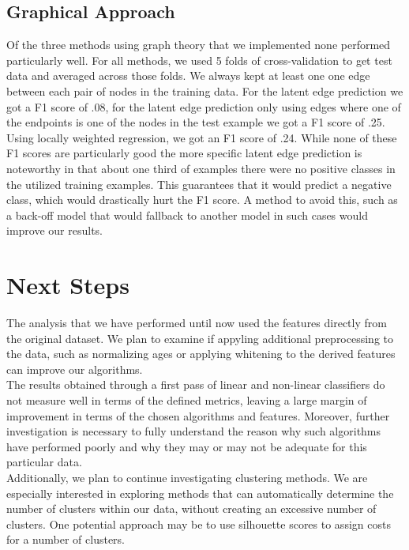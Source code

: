 \documentclass[twoside,twocolumn,paper=letter,fontsize=11pt]{article}
\begin{document}
\subsection{Graphical Approach}

Of the three methods using graph theory that we implemented none performed
particularly well. For all methods, we used 5 folds of cross-validation
to get test data and averaged across those folds. We always kept at least one
one edge between each pair of nodes in the training data. For the latent edge
prediction we got a F1 score of .08, for the latent edge prediction only using
edges where one of the endpoints is one of the nodes in the test example we got
a F1 score of .25. Using locally weighted regression, we got an F1 score of
.24. While none of these F1 scores are particularly good the more specific
latent edge prediction is noteworthy in that about one third of examples there
were no positive classes in the utilized training examples. This guarantees
that it would predict a negative class, which would drastically hurt the F1
score. A method to avoid this, such as a back-off model that would
fallback to another model in such cases would improve our results.
\section{Next Steps}

The analysis that we have performed until now used the features directly from
the original dataset. We plan to examine if appyling additional preprocessing to
the data, such as normalizing ages or applying whitening to the derived features
can improve our algorithms.\\

The results obtained through a first pass of linear and non-linear classifiers
do not measure well in terms of the defined metrics, leaving a large margin of
improvement in terms of the chosen algorithms and features. Moreover, further
investigation is necessary to fully understand  the reason why such algorithms
have performed poorly and why they may or may not be adequate for this
particular data. \\

Additionally, we plan to continue investigating clustering methods. We are
especially interested in exploring methods that can automatically determine the
number of clusters within our data, without creating an excessive number of
clusters. One potential approach may be to use silhouette scores to assign
costs for a number of clusters.\\
\end{document}
